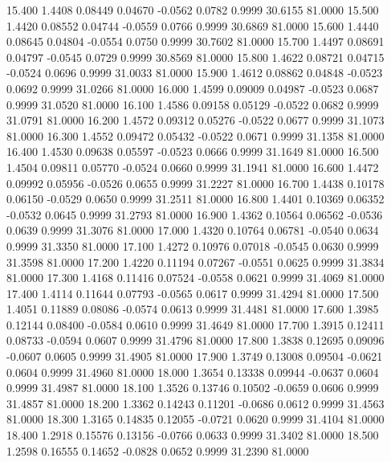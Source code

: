   15.400   1.4408   0.08449   0.04670  -0.0562   0.0782   0.9999  30.6155  81.0000
  15.500   1.4420   0.08552   0.04744  -0.0559   0.0766   0.9999  30.6869  81.0000
  15.600   1.4440   0.08645   0.04804  -0.0554   0.0750   0.9999  30.7602  81.0000
  15.700   1.4497   0.08691   0.04797  -0.0545   0.0729   0.9999  30.8569  81.0000
  15.800   1.4622   0.08721   0.04715  -0.0524   0.0696   0.9999  31.0033  81.0000
  15.900   1.4612   0.08862   0.04848  -0.0523   0.0692   0.9999  31.0266  81.0000
  16.000   1.4599   0.09009   0.04987  -0.0523   0.0687   0.9999  31.0520  81.0000
  16.100   1.4586   0.09158   0.05129  -0.0522   0.0682   0.9999  31.0791  81.0000
  16.200   1.4572   0.09312   0.05276  -0.0522   0.0677   0.9999  31.1073  81.0000
  16.300   1.4552   0.09472   0.05432  -0.0522   0.0671   0.9999  31.1358  81.0000
  16.400   1.4530   0.09638   0.05597  -0.0523   0.0666   0.9999  31.1649  81.0000
  16.500   1.4504   0.09811   0.05770  -0.0524   0.0660   0.9999  31.1941  81.0000
  16.600   1.4472   0.09992   0.05956  -0.0526   0.0655   0.9999  31.2227  81.0000
  16.700   1.4438   0.10178   0.06150  -0.0529   0.0650   0.9999  31.2511  81.0000
  16.800   1.4401   0.10369   0.06352  -0.0532   0.0645   0.9999  31.2793  81.0000
  16.900   1.4362   0.10564   0.06562  -0.0536   0.0639   0.9999  31.3076  81.0000
  17.000   1.4320   0.10764   0.06781  -0.0540   0.0634   0.9999  31.3350  81.0000
  17.100   1.4272   0.10976   0.07018  -0.0545   0.0630   0.9999  31.3598  81.0000
  17.200   1.4220   0.11194   0.07267  -0.0551   0.0625   0.9999  31.3834  81.0000
  17.300   1.4168   0.11416   0.07524  -0.0558   0.0621   0.9999  31.4069  81.0000
  17.400   1.4114   0.11644   0.07793  -0.0565   0.0617   0.9999  31.4294  81.0000
  17.500   1.4051   0.11889   0.08086  -0.0574   0.0613   0.9999  31.4481  81.0000
  17.600   1.3985   0.12144   0.08400  -0.0584   0.0610   0.9999  31.4649  81.0000
  17.700   1.3915   0.12411   0.08733  -0.0594   0.0607   0.9999  31.4796  81.0000
  17.800   1.3838   0.12695   0.09096  -0.0607   0.0605   0.9999  31.4905  81.0000
  17.900   1.3749   0.13008   0.09504  -0.0621   0.0604   0.9999  31.4960  81.0000
  18.000   1.3654   0.13338   0.09944  -0.0637   0.0604   0.9999  31.4987  81.0000
  18.100   1.3526   0.13746   0.10502  -0.0659   0.0606   0.9999  31.4857  81.0000
  18.200   1.3362   0.14243   0.11201  -0.0686   0.0612   0.9999  31.4563  81.0000
  18.300   1.3165   0.14835   0.12055  -0.0721   0.0620   0.9999  31.4104  81.0000
  18.400   1.2918   0.15576   0.13156  -0.0766   0.0633   0.9999  31.3402  81.0000
  18.500   1.2598   0.16555   0.14652  -0.0828   0.0652   0.9999  31.2390  81.0000
